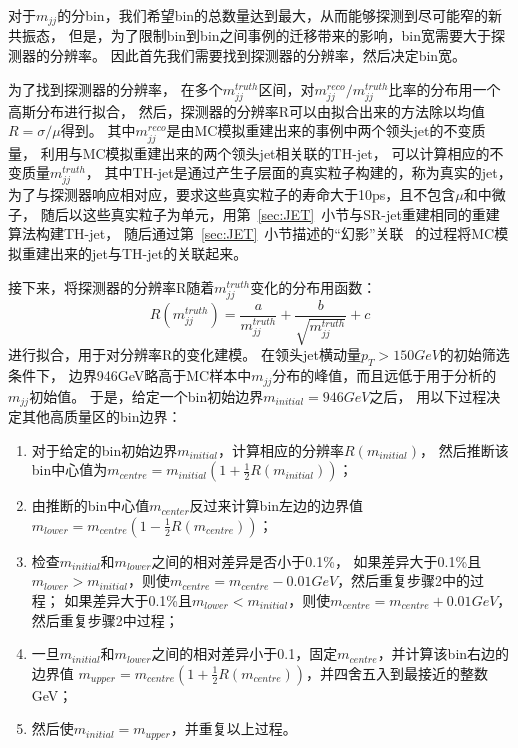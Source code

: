 对于$m_{jj}$的分bin，我们希望bin的总数量达到最大，从而能够探测到尽可能窄的新共振态，
但是，为了限制bin到bin之间事例的迁移带来的影响，bin宽需要大于探测器的分辨率。
因此首先我们需要找到探测器的分辨率，然后决定bin宽。

为了找到探测器的分辨率，
在多个$m_{jj}^{truth}$区间，对$m_{jj}^{reco}/m_{jj}^{truth}$比率的分布用一个高斯分布进行拟合，
然后，探测器的分辨率R可以由拟合出来的方法除以均值$R=\sigma/\mu$得到。
其中$m_{jj}^{reco}$是由MC模拟重建出来的事例中两个领头jet的不变质量，
利用与MC模拟重建出来的两个领头jet相关联的TH-jet，
可以计算相应的不变质量$m_{jj}^{truth}$，
其中TH-jet是通过产生子层面的真实粒子构建的，称为真实的jet，
为了与探测器响应相对应，要求这些真实粒子的寿命大于10ps，且不包含$\mu$和中微子，
随后以这些真实粒子为单元，用第~\ref{sec:JET}~小节与SR-jet重建相同的重建算法构建TH-jet，
随后通过第~\ref{sec:JET}~小节描述的“幻影”关联~\cite{Cacciari:2008gn}
的过程将MC模拟重建出来的jet与TH-jet的关联起来。

接下来，将探测器的分辨率R随着$m_{jj}^{truth}$变化的分布用函数：
\begin{equation} 
\label{eq:MJJR1}
R(m_{jj}^{truth})=\frac{a}{m_{jj}^{truth}}+\frac{b}{\sqrt{m_{jj}^{truth}}}+c
\end{equation}
进行拟合，用于对分辨率R的变化建模。
在领头jet横动量$p_T>150GeV$的初始筛选条件下，
边界946GeV略高于MC样本中$m_{jj}$分布的峰值，而且远低于用于分析的$m_{jj}$初始值。
于是，给定一个bin初始边界$m_{initial}=946GeV$之后，
用以下过程决定其他高质量区的bin边界：
\begin{enumerate}
  \item 对于给定的bin初始边界$m_{initial}$，计算相应的分辨率$R(m_{initial})$，
  然后推断该bin中心值为$m_{centre}=m_{initial}(1+\frac{1}{2}R(m_{initial}))$；
  \item 由推断的bin中心值$m_{center}$反过来计算bin左边的边界值
  $m_{lower}=m_{centre}(1-\frac{1}{2}R(m_{centre}))$；
  \item 检查$m_{initial}$和$m_{lower}$之间的相对差异是否小于0.1\%，
  如果差异大于0.1\%且$m_{lower}>m_{initial}$，则使$m_{centre}=m_{centre}-0.01GeV$，然后重复步骤2中的过程；
 如果差异大于0.1\%且$m_{lower}<m_{initial}$，则使$m_{centre}=m_{centre}+0.01GeV$，然后重复步骤2中过程；
  \item 一旦$m_{initial}$和$m_{lower}$之间的相对差异小于0.1，固定$m_{centre}$，并计算该bin右边的边界值
  $m_{upper}=m_{centre}(1+\frac{1}{2}R(m_{centre}))$，并四舍五入到最接近的整数GeV；
  \item 然后使$m_{initial}=m_{upper}$，并重复以上过程。
\end{enumerate}












